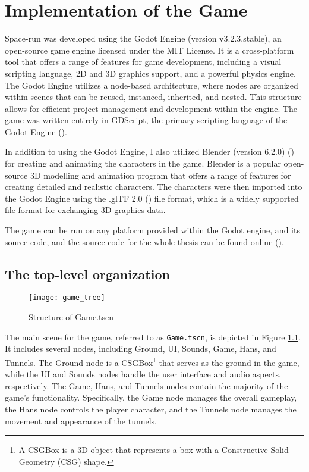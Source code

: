 \chapter{Implementation of the Game}
Space-run was developed using the Godot Engine (version v3.2.3.stable), an open-source game engine licensed under the MIT License. It is a cross-platform tool that offers a range of features for game development, including a visual scripting language, 2D and 3D graphics support, and a powerful physics engine. The Godot Engine utilizes a node-based architecture, where nodes are organized within scenes that can be reused, instanced, inherited, and nested. This structure allows for efficient project management and development within the engine. The game was written entirely in GDScript, the primary scripting language of the Godot Engine (\cite{GodotDocs}).

In addition to using the Godot Engine, I also utilized Blender (version 6.2.0) (\cite{blender}) for creating and animating the characters in the game. Blender is a popular open-source 3D modelling and animation program that offers a range of features for creating detailed and realistic characters. The characters were then imported into the Godot Engine using the .glTF 2.0 (\cite{gltf}) file format, which is a widely supported file format for exchanging 3D graphics data.

The game can be run on any platform provided within the Godot engine, and its source code, and the source code for the whole thesis can be found online (\cite{spacerunai}).

\section{The top-level organization}
\begin{figure}[h]
    \centering
    \texttt{[image: game\_tree]}
    \caption{Structure of Game.tscn}
    \label{fig:game_tree}
\end{figure}

The main scene for the game, referred to as \texttt{Game.tscn}, is depicted in Figure \ref{fig:game_tree}. It includes several nodes, including Ground, UI, Sounds, Game, Hans, and Tunnels. The Ground node is a CSGBox\footnote{A CSGBox is a 3D object that represents a box with a Constructive Solid Geometry (CSG) shape.} that serves as the ground in the game, while the UI and Sounds nodes handle the user interface and audio aspects, respectively. The Game, Hans, and Tunnels nodes contain the majority of the game's functionality. Specifically, the Game node manages the overall gameplay, the Hans node controls the player character, and the Tunnels node manages the movement and appearance of the tunnels.

